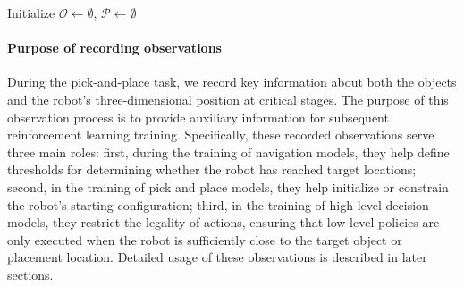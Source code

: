 \documentclass[english, 12pt, a4paper, elec, utf8, a-2b, online]{aaltothesis}
\begin{document}
\begin{algorithm}[H]
\caption{Observation algorithm for pick-and-place tasks}

Initialize $\mathcal{O} \gets \emptyset$, $\mathcal{P} \gets \emptyset$\;

\end{algorithm}

\paragraph{Purpose of recording observations}
During the pick-and-place task, we record key information about both the objects and the robot’s three-dimensional position at critical stages. 
The purpose of this observation process is to provide auxiliary information for subsequent reinforcement learning training. 
Specifically, these recorded observations serve three main roles: 
first, during the training of navigation models, they help define thresholds for determining whether the robot has reached target locations; 
second, in the training of pick and place models, they help initialize or constrain the robot’s starting configuration; 
third, in the training of high-level decision models, they restrict the legality of actions, ensuring that low-level policies are only executed when the robot is sufficiently close to the target object or placement location. 
Detailed usage of these observations is described in later sections.
\end{document}
